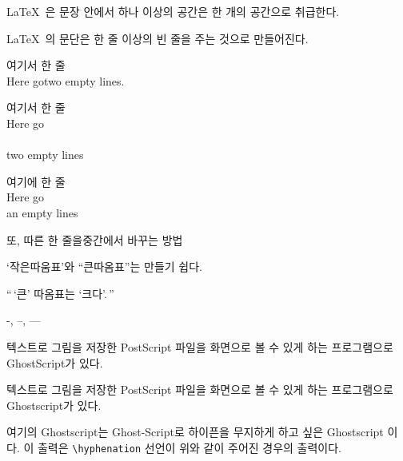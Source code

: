 \documentclass[11pt]{article}
\begin{document}
\LaTeX\    은 문장 안에서 하나     이상의 공간은   한 개의 공간으로 취급한다.

\setlength{\parindent}{1cm}
\LaTeX\ 의    문단은 한 줄 이상의 빈 줄을 주는 것으로 만들어진다.

여기서 \newline\newline 한 줄 \\ Here go\newline \null \newline two empty lines.

여기서 \newline 한 줄 \\ Here go \\ \\ two empty lines

여기에 한 줄 \\[2cm]
Here go \\ an empty lines

또, 따른 한 줄을\linebreak 중간에서 바꾸는 방법

`작은따움표'와 ``큰따옴표''는 만들기 쉽다.

``\,`큰' 따옴표는 `크다'.\,''

-, --, ---

텍스트로 그림을 저장한 Po\-st\-Script 파일을 화면으로 볼 수 있게 하는 프로그램으로 Gho\-st\-Script가 있다.

텍스트로 그림을 저장한 PostScript 파일을 화면으로 볼 수 있게 하는 프로그램으로 Ghostscript가 있다.

여기의 Ghostscript는 Ghost-Script로 하이픈을 무지하게 하고 싶은 Ghostscript 이다. 이 출력은 \verb|\hyphenation| 선언이 위와 같이 주어진 경우의 출력이다.
\end{document}
